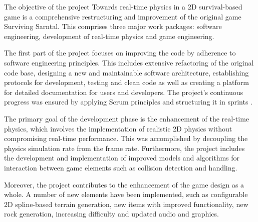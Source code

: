 \nocite{ProjectCode}
The objective of the project \glqq Towards real-time physics in a 2D survival-based game\grqq{} is
a comprehensive restructuring and improvement of the original game \glqq Surviving Sarntal\grqq{}.
This comprises three major work packages: software engineering, development of real-time physics and game engineering.

The first part of the project focuses on improving the code by adherence to software engineering principles.
This includes extensive refactoring of the original code base, designing a new and maintainable software architecture,
establishing protocols for development, testing and clean code as well as creating a platform for detailed documentation for users and developers.
The project's continuous progress was ensured by applying Scrum principles and structuring it in sprints \cite{scrum}.

The primary goal of the development phase is the enhancement of the real-time physics,
which involves the implementation of realistic 2D physics without compromising real-time performance.
This was accomplished by decoupling the physics simulation rate from the frame rate.
Furthermore, the project includes the development and implementation of improved models and algorithms
for interaction between game elements such as collision detection and handling.

Moreover, the project contributes to the enhancement of the game design as a whole.
A number of new elements have been implemented, such as configurable 2D spline-based terrain generation, 
new items with improved functionality, new rock generation, increasing difficulty and updated audio and graphics.


